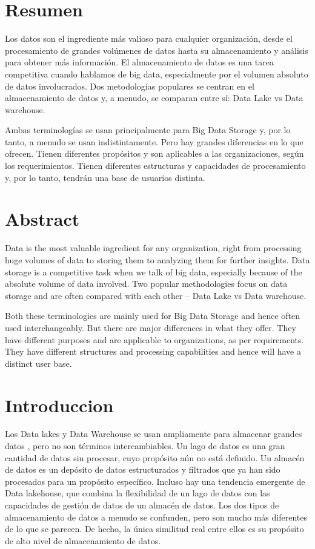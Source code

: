 \documentclass[twoside,twocolumn]{article}
\begin{document}
\section{Resumen}
Los datos son el ingrediente más valioso para cualquier organización, desde el procesamiento de grandes volúmenes de datos hasta su almacenamiento y análisis para obtener más información. El almacenamiento de datos es una tarea competitiva cuando hablamos de big data, especialmente por el volumen absoluto de datos involucrados. Dos metodologías populares se centran en el almacenamiento de datos y, a menudo, se comparan entre sí: Data Lake vs Data warehouse.

Ambas terminologías se usan principalmente para Big Data Storage y, por lo tanto, a menudo se usan indistintamente. Pero hay grandes diferencias en lo que ofrecen. Tienen diferentes propósitos y son aplicables a las organizaciones, según los requerimientos. Tienen diferentes estructuras y capacidades de procesamiento y, por lo tanto, tendrán una base de usuarios distinta.



\section{Abstract}

Data is the most valuable ingredient for any organization, right from processing huge volumes of data to storing them to analyzing them for further insights. Data storage is a competitive task when we talk of big data, especially because of the absolute volume of data involved. Two popular methodologies focus on data storage and are often compared with each other – Data Lake vs Data warehouse.

Both these terminologies are mainly used for Big Data Storage and hence often used interchangeably. But there are major differences in what they offer. They have different purposes and are applicable to organizations, as per requirements. They have different structures and processing capabilities and hence will have a distinct user base.







\section{Introduccion}
Los Data lakes y Data Warehouse se usan ampliamente para almacenar grandes datos , pero no son términos intercambiables. Un lago de datos es una gran cantidad de datos sin procesar, cuyo propósito aún no está definido. Un almacén de datos es un depósito de datos estructurados y filtrados que ya han sido procesados para un propósito específico. Incluso hay una tendencia emergente de Data lakehouse, que combina la flexibilidad de un lago de datos con las capacidades de gestión de datos de un almacén de datos.
Los dos tipos de almacenamiento de datos a menudo se confunden, pero son mucho más diferentes de lo que se parecen. De hecho, la única similitud real entre ellos es su propósito de alto nivel de almacenamiento de datos.
\end{document}
